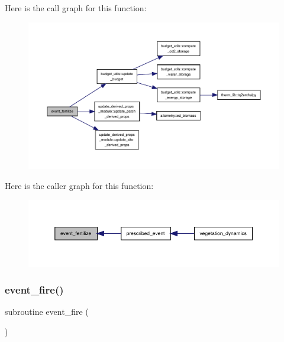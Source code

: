 Here is the call graph for this function\+:
\nopagebreak
\begin{figure}[H]
\begin{center}
\leavevmode
\includegraphics[width=350pt]{events_8f90_a322bdb70cc0c534c9e30db1a3a4b58a0_cgraph}
\end{center}
\end{figure}
Here is the caller graph for this function\+:
\nopagebreak
\begin{figure}[H]
\begin{center}
\leavevmode
\includegraphics[width=350pt]{events_8f90_a322bdb70cc0c534c9e30db1a3a4b58a0_icgraph}
\end{center}
\end{figure}
\mbox{\label{events_8f90_af7863095b0112267385c3f252218c678}} 
\subsubsection{\texorpdfstring{event\+\_\+fire()}{event\_fire()}}
{\footnotesize\ttfamily subroutine event\+\_\+fire (\begin{DoxyParamCaption}{ }\end{DoxyParamCaption})}

